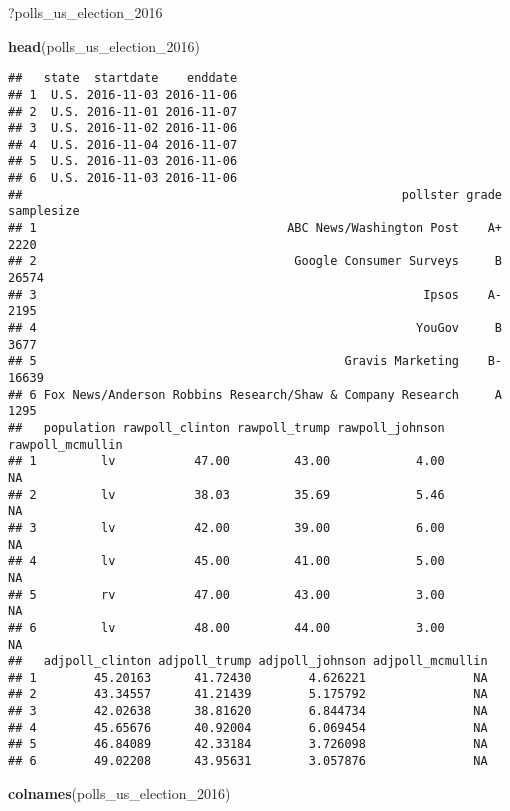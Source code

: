 \documentclass[
]{article}
\newenvironment{Shaded}{\begin{snugshade}}{\end{snugshade}}
\newcommand{\DecValTok}[1]{\textcolor[rgb]{0.00,0.00,0.81}{#1}}
\newcommand{\KeywordTok}[1]{\textcolor[rgb]{0.13,0.29,0.53}{\textbf{#1}}}
\newcommand{\NormalTok}[1]{#1}
\begin{document}
\begin{Shaded}
\begin{Highlighting}[]
\NormalTok{?polls_us_election_}\DecValTok{2016}

\KeywordTok{head}\NormalTok{(polls_us_election_}\DecValTok{2016}\NormalTok{)}
\end{Highlighting}
\end{Shaded}

\begin{verbatim}
##   state  startdate    enddate
## 1  U.S. 2016-11-03 2016-11-06
## 2  U.S. 2016-11-01 2016-11-07
## 3  U.S. 2016-11-02 2016-11-06
## 4  U.S. 2016-11-04 2016-11-07
## 5  U.S. 2016-11-03 2016-11-06
## 6  U.S. 2016-11-03 2016-11-06
##                                                     pollster grade samplesize
## 1                                   ABC News/Washington Post    A+       2220
## 2                                    Google Consumer Surveys     B      26574
## 3                                                      Ipsos    A-       2195
## 4                                                     YouGov     B       3677
## 5                                           Gravis Marketing    B-      16639
## 6 Fox News/Anderson Robbins Research/Shaw & Company Research     A       1295
##   population rawpoll_clinton rawpoll_trump rawpoll_johnson rawpoll_mcmullin
## 1         lv           47.00         43.00            4.00               NA
## 2         lv           38.03         35.69            5.46               NA
## 3         lv           42.00         39.00            6.00               NA
## 4         lv           45.00         41.00            5.00               NA
## 5         rv           47.00         43.00            3.00               NA
## 6         lv           48.00         44.00            3.00               NA
##   adjpoll_clinton adjpoll_trump adjpoll_johnson adjpoll_mcmullin
## 1        45.20163      41.72430        4.626221               NA
## 2        43.34557      41.21439        5.175792               NA
## 3        42.02638      38.81620        6.844734               NA
## 4        45.65676      40.92004        6.069454               NA
## 5        46.84089      42.33184        3.726098               NA
## 6        49.02208      43.95631        3.057876               NA
\end{verbatim}

\begin{Shaded}
\begin{Highlighting}[]
\KeywordTok{colnames}\NormalTok{(polls_us_election_}\DecValTok{2016}\NormalTok{)}
\end{Highlighting}
\end{Shaded}
\end{document}
